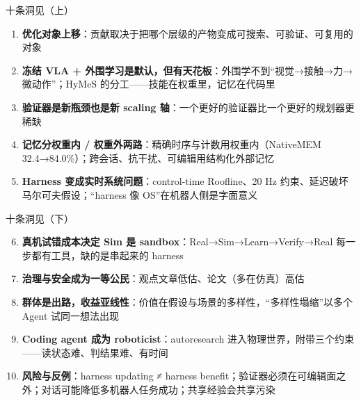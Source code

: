 \documentclass[aspectratio=169,10pt]{beamer}
\begin{document}
\begin{frame}{十条洞见（上）}
\begin{enumerate}
  \item \textbf{优化对象上移}：贡献取决于把哪个层级的产物变成可搜索、可验证、可复用的对象
  \item \textbf{冻结 VLA + 外围学习是默认，但有天花板}：外围学不到“视觉→接触→力→微动作”；HyMeS 的分工——技能在权重里，记忆在代码里
  \item \textbf{验证器是新瓶颈也是新 scaling 轴}：一个更好的验证器比一个更好的规划器更稀缺
  \item \textbf{记忆分权重内 / 权重外两路}：精确时序与计数用权重内（NativeMEM 32.4→84.0\%）；跨会话、抗干扰、可编辑用结构化外部记忆
  \item \textbf{Harness 变成实时系统问题}：control-time Roofline、20 Hz 约束、延迟破坏马尔可夫假设；“harness 像 OS”在机器人侧是字面意义
\end{enumerate}
\end{frame}

\begin{frame}{十条洞见（下）}
\begin{enumerate}
  \setcounter{enumi}{5}
  \item \textbf{真机试错成本决定 Sim 是 sandbox}：Real→Sim→Learn→Verify→Real 每一步都有工具，缺的是串起来的 harness
  \item \textbf{治理与安全成为一等公民}：观点文章低估、论文（多在仿真）高估
  \item \textbf{群体是出路，收益亚线性}：价值在假设与场景的多样性，“多样性塌缩”以多个 Agent 试同一想法出现
  \item \textbf{Coding agent 成为 roboticist}：autoresearch 进入物理世界，附带三个约束——读状态难、判结果难、有时间
  \item \textbf{风险与反例}：harness updating ≠ harness benefit；验证器必须在可编辑面之外；对话可能降低多机器人任务成功；共享经验会共享污染
\end{enumerate}
\end{frame}
\end{document}
